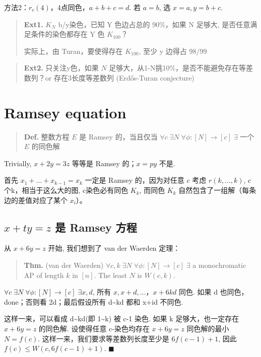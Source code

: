 方法2：$r_c(4)$，4点同色，$a+b+c=d$. 若 $a=b$, 选 $x=a,y=b+c$.

\begin{quotation}
\textbf{Ext1.} $K_N$ b/y染色，已知 Y 色边占总的 90\%，如果 N 足够大, 是否任意满足条件的染色都存在 Y 色 $K_{100}$？

实际上，由 Turan，要使得存在 $K_{100}$, 至少 y 边得占 $98/99$
\end{quotation}

\begin{quotation}
\textbf{Ext2.} 只关注y色，如果 $N$ 足够大，从1-N挑10\%，是否不能避免存在等差数列？or 存在3长度等差数列 (Erdős-Turan conjecture)
\end{quotation}


\section{Ramsey equation}

\begin{quotation}
\textbf{Def.} 整数方程 $E$ 是 Ramsey 的，当且仅当 $\forall c\;\exists N\;\forall \phi:[N]\to[c]\;\exists$ 一个 $E$ 的同色解
\end{quotation}

Trivially, $x+2y=3z$ 等等是 Ramsey 的；$x=py$ 不是.

首先 $x_1+\dots+x_{k-1}=x_k$ 一定是 Ramsey 的，因为对任意 $c$ 考虑 $r(k,\dots,k)$, c个k，相当于这么大的图, c染色必有同色 $K_k$, 而同色 $K_k$ 自然包含了一组解（每条边的差值对应了某个 $x_i$）。

\subsection{$x+ty=z$ 是 Ramsey 方程}

从 $x+6y=z$ 开始, 我们想到了 van der Waerden 定理：

\begin{quotation}
\textbf{Thm.} (van der Waerden) $\forall c,k\;\exists N\;\forall\phi:[N]\to[c]\;\exists$ a monochromatic AP of length $k$ in $[n]$. The least $N$ is $W(c,k)$.
\end{quotation}

$\forall c\;\exists N\;\forall\phi:[N]\to[c]\;\exists x,d$, 所有 $x,x+d,\dots，x+6kd$ 同色. 如果 d 也同色，done；否则看 2d；最后假设所有 d\textasciitilde{}kd 都和 x+id 不同色.


这样一来，可以看成 d\textasciitilde{}kd(即 1\textasciitilde{}k) 被 c-1 染色. 如果 k 足够大，也一定存在 $x+6y=z$ 的同色解. 设使得任意 c-染色均存在 $x+6y=z$ 同色解的最小 $N=f(c)$. 这样一来，我们要求等差数列长度至少是 $6f(c-1)+1$, 因此 $f(c)\leq W(c,6f(c-1)+1)$. $\blacksquare$

